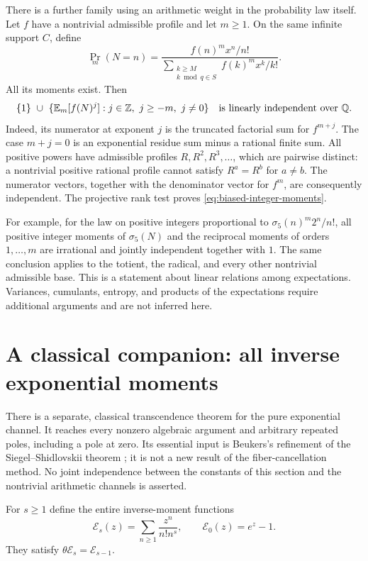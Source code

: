 There is a further family using an arithmetic weight in the probability
law itself.  Let $f$ have a nontrivial admissible profile and let $m\geq1$.
On the same infinite support $C$, define
\[
 \Pr_m(N=n)=\frac{f(n)^m x^n/n!}
 {\displaystyle\sum_{\substack{k\geq M\\k\bmod q\in S}}
                       f(k)^m x^k/k!}.
\]
All its moments exist.  Then
\begin{equation}\label{eq:biased-integer-moments}
 \{1\}\ \cup\
 \{\mathbb E_m[f(N)^j]:j\in\mathbb Z,\ j\geq-m,\ j\ne0\}
 \quad\hbox{is linearly independent over }\mathbb Q.
\end{equation}
Indeed, its numerator at exponent $j$ is the truncated factorial sum
for $f^{m+j}$.  The case $m+j=0$ is an exponential residue sum minus
a rational finite sum.  All positive powers have admissible profiles
$R,R^2,R^3,\ldots$, which are pairwise distinct: a nontrivial positive
rational profile cannot satisfy $R^a=R^b$ for $a\ne b$.
The numerator vectors, together with the denominator vector for $f^m$,
are consequently independent.  The projective rank test proves
\eqref{eq:biased-integer-moments}.

For example, for the law on positive integers proportional to
$\sigma_5(n)^m2^n/n!$, all positive integer moments of $\sigma_5(N)$
and the reciprocal moments of orders $1,\ldots,m$ are irrational and
jointly independent together with $1$.  The same conclusion applies
to the totient, the radical, and every other nontrivial admissible base.
This is a statement about linear relations among expectations.  Variances,
cumulants, entropy, and products of the expectations require additional
arguments and are not inferred here.


\section{A classical companion: all inverse exponential moments}
\label{sec:v5-classical-inverse}

There is a separate, classical transcendence theorem for the pure
exponential channel.  It reaches every nonzero algebraic argument and
arbitrary repeated poles, including a pole at zero.  Its essential input
is Beukers's refinement of the Siegel--Shidlovskii theorem
\cite[Corollary~1.4]{Beukers2006V5}; it is not a new result of the
fiber-cancellation method.  No joint independence between the constants
of this section and the nontrivial arithmetic channels is asserted.

For $s\geq1$ define the entire inverse-moment functions
\[
 \mathcal E_s(z)=\sum_{n\geq1}\frac{z^n}{n!n^s},
 \qquad \mathcal E_0(z)=e^z-1.
\]
They satisfy $\theta\mathcal E_s=\mathcal E_{s-1}$.


